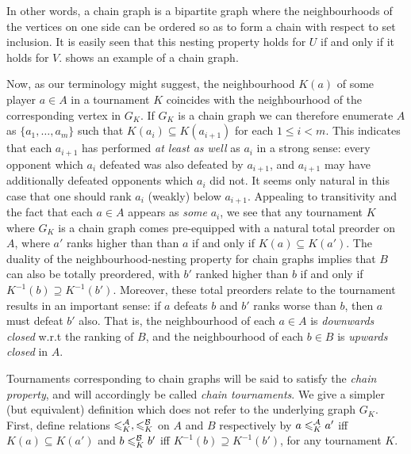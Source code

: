 In other words, a chain graph is a bipartite graph where the neighbourhoods of
the vertices on one side can be ordered so as to form a chain with respect to
set inclusion. It is easily seen that this nesting property holds for $U$ if
and only if it holds for $V$.  shows an example
of a chain graph.

Now, as our terminology might suggest, the neighbourhood $K(a)$ of some player
$a \in A$ in a tournament $K$ coincides with the neighbourhood of the
corresponding vertex in $G_K$. If $G_K$ is a chain graph we can therefore
enumerate $A$ as $\{a_1,\ldots,a_m\}$ such that $K(a_i) \subseteq K(a_{i+1})$
for each $1 \le i < m$. This indicates that each $a_{i+1}$ has performed
\emph{at least as well} as $a_i$ in a strong sense: every opponent which $a_i$
defeated was also defeated by $a_{i+1}$, and $a_{i+1}$ may have additionally
defeated opponents which $a_i$ did not.\footnotemark{} It seems only natural in
this case that one should rank $a_i$ (weakly) below $a_{i+1}$.
%
%
Appealing to transitivity and the fact that each $a \in A$ appears as
\emph{some} $a_i$, we see that any tournament $K$ where $G_K$ is a chain graph
comes pre-equipped with a natural total preorder on $A$, where $a'$ ranks
higher than than $a$ if and only if $K(a) \subseteq K(a')$. The duality of the
neighbourhood-nesting property for chain graphs implies that $B$ can also be
totally preordered, with $b'$ ranked higher than $b$ if and only if $K^{-1}(b)
\supseteq K^{-1}(b')$.\footnotemark{}
%
Moreover, these total preorders relate to the tournament results in an
important sense: if $a$ defeats $b$ and $b'$ ranks worse than $b$, then $a$
must defeat $b'$ also. That is, the neighbourhood of each $a \in A$ is
\emph{downwards closed} w.r.t the ranking of $B$, and the neighbourhood of each
$b \in B$ is \emph{upwards closed} in $A$.


Tournaments corresponding to chain graphs will be said to satisfy the
\emph{chain property}, and will accordingly be called \emph{chain tournaments}.
We give a simpler (but equivalent) definition which does not refer to the
underlying graph $G_K$. First, define relations ${\leqslant^{\mathcal{A}}_K}, {\leqslant^{\mathcal{B}}_K}$ on
$A$ and $B$ respectively by $a \leqslant^{\mathcal{A}}_K a'$ iff $K(a) \subseteq K(a')$ and $b
\leqslant^{\mathcal{B}}_K b'$ iff $K^{-1}(b) \supseteq K^{-1}(b')$, for any tournament $K$.

